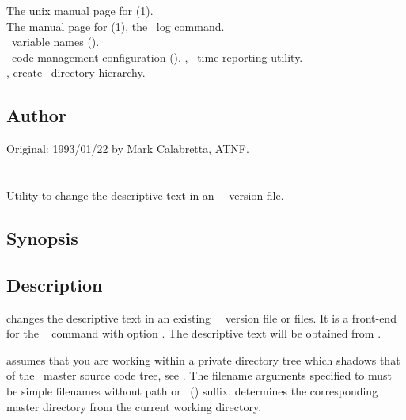 The unix manual page for (1).\\
The manual page for (1), the \rcs\ log command.\\
\aipspp\ variable names ().\\
\aipspp\ code management configuration ().
, \aipspp\ time reporting utility.\\
, create \aipspp\ directory hierarchy.

\subsection*{Author}

Original: 1993/01/22 by Mark Calabretta, ATNF.


\newpage
\section{}
\label{am}

Utility to change the descriptive text in an \aipspp\ \rcs\ version
file.

\subsection*{Synopsis}

\begin{synopsis}
\end{synopsis}

\subsection*{Description}

 changes the descriptive text in an existing \aipspp\ \rcs\ version
file or files.  It is a front-end for the \rcs\  command with
option .  The descriptive text will be obtained from .

 assumes that you are working within a private directory tree which
shadows that of the \aipspp\ master source code tree, see .
The filename arguments specified to  must be simple filenames without
path or \rcs\ () suffix.   determines the corresponding
master directory from the current working directory.

